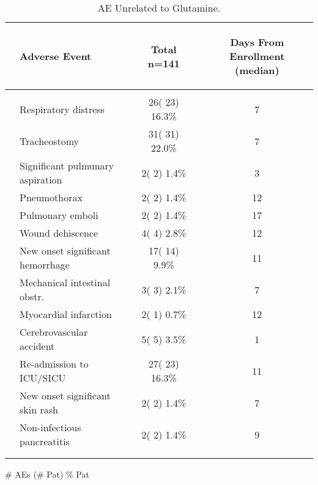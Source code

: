 \documentclass[dvips, 10pt]{article}
\begin{document}
\clearpage
\begin{table}[t]
\caption
{ AE Unrelated to Glutamine. }
\begin{center}
\begin{tabular}{ @{}l@{}
@{}l@{}@{}p{1.5em}@{}@{}c@{}@{}p{1.5em}@{}@{}c@{}
}
\hline

& \parbox{6em}{\begin{center}Adverse Event\end{center}} && \parbox{6em}{\begin{center}Total n=141\end{center}} && \parbox{6em}{\begin{center}Days From Enrollment  (median)\end{center}} \\

\hline

\\
& Respiratory distress && 26( 23) 16.3\% && 7 \\
& Tracheostomy && 31( 31) 22.0\% && 7 \\
& Significant pulmunary aspiration && 2(  2)  1.4\% && 3 \\
& Pneumothorax && 2(  2)  1.4\% && 12 \\
& Pulmonary emboli && 2(  2)  1.4\% && 17 \\
& Wound dehiscence && 4(  4)  2.8\% && 12 \\
& New onset significant hemorrhage && 17( 14)  9.9\% && 11 \\
& 
Mechanical intestinal obstr. && 3(  3)  2.1\% && 7 \\
& Myocardial infarction && 2(  1)  0.7\% && 12 \\
& Cerebrovascular accident && 5(  5)  3.5\% && 1 \\
& Re-admission to ICU/SICU && 27( 23) 16.3\% && 11 \\
& New onset significant skin rash && 2(  2)  1.4\% && 7 \\
& 
Non-infectious pancreatitis && 2(  2)  1.4\% && 9 \\
\\
\hline \\

\end{tabular}


\parbox{ 5in }{ \# AEs (\# Pat) \% Pat } \\
 \vspace{1em}\end{center}
 \end{table}
\end{document}
